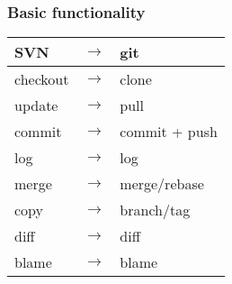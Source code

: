 \begin{frame}
	\frametitle{Basic functionality}
	\begin{block}{}
		\begin{center}
			\begin{small}
				\begin{tabular}{|lcl|}
					\hline
					SVN & $\rightarrow$ & git \\
					\hline
					checkout & $\rightarrow$ & clone \\
					update & $\rightarrow$ & pull \\
					commit & $\rightarrow$ & commit + push \\
					log & $\rightarrow$ & log \\
					merge & $\rightarrow$ & merge/rebase \\
					copy & $\rightarrow$ & branch/tag \\
					diff & $\rightarrow$ & diff \\
					blame & $\rightarrow$ & blame \\
					\hline
				\end{tabular}
			\end{small}
		\end{center}
	\end{block}
\end{frame}
